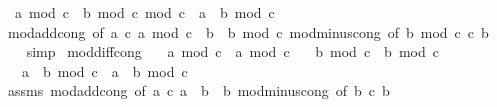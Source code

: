 \begin{isabellebody}
\ \ {\isachardoublequoteopen}{\isacharparenleft}{\kern0pt}a\ mod\ c\ {\isacharminus}{\kern0pt}\ b\ mod\ c{\isacharparenright}{\kern0pt}\ mod\ c\ {\isacharequal}{\kern0pt}\ {\isacharparenleft}{\kern0pt}a\ {\isacharminus}{\kern0pt}\ b{\isacharparenright}{\kern0pt}\ mod\ c{\isachardoublequoteclose}\isanewline
%
\isadelimproof
\ \ %
\endisadelimproof
%
\isatagproof
{}\isamarkupfalse%
\ mod{\isacharunderscore}{\kern0pt}add{\isacharunderscore}{\kern0pt}cong\ {\isacharbrackleft}{\kern0pt}of\ a\ c\ {\isachardoublequoteopen}a\ mod\ c{\isachardoublequoteclose}\ {\isachardoublequoteopen}{\isacharminus}{\kern0pt}\ b{\isachardoublequoteclose}\ {\isachardoublequoteopen}{\isacharminus}{\kern0pt}\ {\isacharparenleft}{\kern0pt}b\ mod\ c{\isacharparenright}{\kern0pt}{\isachardoublequoteclose}{\isacharbrackright}{\kern0pt}\ mod{\isacharunderscore}{\kern0pt}minus{\isacharunderscore}{\kern0pt}cong\ {\isacharbrackleft}{\kern0pt}of\ {\isachardoublequoteopen}b\ mod\ c{\isachardoublequoteclose}\ c\ b{\isacharbrackright}{\kern0pt}\isanewline
\ \ \isamarkupfalse%
\ simp%
\endisatagproof
{\isafoldproof}%
%
\isadelimproof
\isanewline
%
\endisadelimproof
\isanewline
{}\isamarkupfalse%
\ mod{\isacharunderscore}{\kern0pt}diff{\isacharunderscore}{\kern0pt}cong{\isacharcolon}{\kern0pt}\isanewline
\ \ \ {\isachardoublequoteopen}a\ mod\ c\ {\isacharequal}{\kern0pt}\ a{\isacharprime}{\kern0pt}\ mod\ c{\isachardoublequoteclose}\isanewline
\ \ \ {\isachardoublequoteopen}b\ mod\ c\ {\isacharequal}{\kern0pt}\ b{\isacharprime}{\kern0pt}\ mod\ c{\isachardoublequoteclose}\isanewline
\ \ \ {\isachardoublequoteopen}{\isacharparenleft}{\kern0pt}a\ {\isacharminus}{\kern0pt}\ b{\isacharparenright}{\kern0pt}\ mod\ c\ {\isacharequal}{\kern0pt}\ {\isacharparenleft}{\kern0pt}a{\isacharprime}{\kern0pt}\ {\isacharminus}{\kern0pt}\ b{\isacharprime}{\kern0pt}{\isacharparenright}{\kern0pt}\ mod\ c{\isachardoublequoteclose}\isanewline
%
\isadelimproof
\ \ %
\endisadelimproof
%
\isatagproof
{}\isamarkupfalse%
\ assms\ mod{\isacharunderscore}{\kern0pt}add{\isacharunderscore}{\kern0pt}cong\ {\isacharbrackleft}{\kern0pt}of\ a\ c\ a{\isacharprime}{\kern0pt}\ {\isachardoublequoteopen}{\isacharminus}{\kern0pt}\ b{\isachardoublequoteclose}\ {\isachardoublequoteopen}{\isacharminus}{\kern0pt}\ b{\isacharprime}{\kern0pt}{\isachardoublequoteclose}{\isacharbrackright}{\kern0pt}\ mod{\isacharunderscore}{\kern0pt}minus{\isacharunderscore}{\kern0pt}cong\ {\isacharbrackleft}{\kern0pt}of\ b\ c\ {\isachardoublequoteopen}b{\isacharprime}{\kern0pt}{\isachardoublequoteclose}{\isacharbrackright}{\kern0pt}\isanewline

\end{isabellebody}
